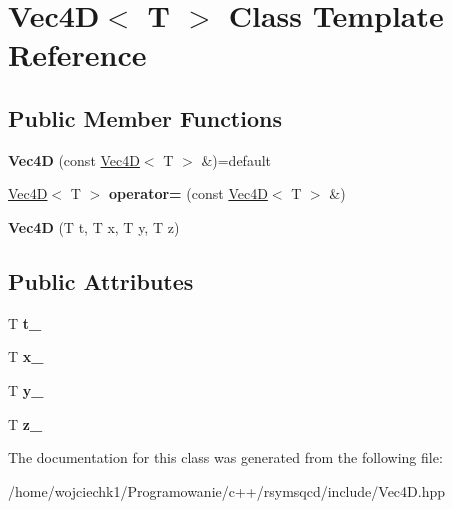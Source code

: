 \hypertarget{classVec4D}{}\section{Vec4D$<$ T $>$ Class Template Reference}
\label{classVec4D}
\subsection*{Public Member Functions}
\begin{DoxyCompactItemize}
\item 
\mbox{\label{classVec4D_af7fd3d505e4ee71963da32d4738a3721}} 
{\bfseries Vec4D} (const \hyperlink{classVec4D}{Vec4D}$<$ T $>$ \&)=default
\item 
\mbox{\label{classVec4D_aa9aa821a1d139e83672efdb1a497d829}} 
\hyperlink{classVec4D}{Vec4D}$<$ T $>$ {\bfseries operator=} (const \hyperlink{classVec4D}{Vec4D}$<$ T $>$ \&)
\item 
\mbox{\label{classVec4D_a417cd8a1639f6a9e8b478d837a057db6}} 
{\bfseries Vec4D} (T t, T x, T y, T z)
\end{DoxyCompactItemize}
\subsection*{Public Attributes}
\begin{DoxyCompactItemize}
\item 
\mbox{\label{classVec4D_a2a0096c956b91a72261ca940d9210efc}} 
T {\bfseries t\+\_\+}
\item 
\mbox{\label{classVec4D_aa9a006cc20d8ff45c9bb98c282a93776}} 
T {\bfseries x\+\_\+}
\item 
\mbox{\label{classVec4D_a98a9fe30736359383dd5c10b2a31a4bc}} 
T {\bfseries y\+\_\+}
\item 
\mbox{\label{classVec4D_a0b22629bd0e4ec4774df3310eea443f4}} 
T {\bfseries z\+\_\+}
\end{DoxyCompactItemize}


The documentation for this class was generated from the following file\+:\begin{DoxyCompactItemize}
\item 
/home/wojciechk1/\+Programowanie/c++/rsymsqcd/include/Vec4\+D.\+hpp\end{DoxyCompactItemize}
